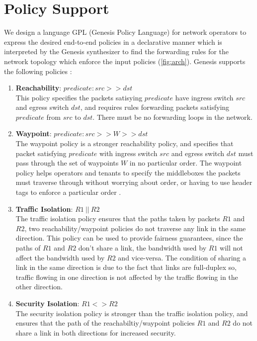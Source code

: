 \section{Policy Support} \label{sec:policy}
We design a language GPL (Genesis Policy Language) for network operators to express the desired end-to-end policies in a declarative manner which is interpreted by the Genesis synthesizer to find the forwarding rules for the network topology which enforce the input policies (\cref{fig:arch}). Genesis supports the following policies : 
\begin{enumerate} 
	\item \textbf{Reachability}: $predicate : src >> dst$ \\
	This policy specifies the packets satisying $predicate$ have ingress switch $src$ and egress switch $dst$, and requires rules forwarding packets satisfying $predicate$ from $src$ to $dst$. There must be no forwarding loops in the network. 
	\item \textbf{Waypoint}: $predicate : src >> W >> dst$ \\
	The waypoint policy is a stronger reachability policy, and specifies that packet satisfying $predicate$ with ingress switch $src$ and egress switch $dst$ must pass through the set of waypoints $W$ in no particular order. The waypoint policy helps operators and tenants to specify the middleboxes the packets must traverse through without worrying about order, or having to use header tags to enforce a particular order \cite{flowtags}. 
	\item \textbf{Traffic Isolation}:  $R1 \ || \ R2$ \\
	The traffic isolation policy ensures that the paths taken by packets $R1$ and $R2$, two reachability/waypoint policies do not traverse any link in the same direction. This policy can be used to provide fairness guarantees, since the paths of $R1$ and $R2$ don't share a link, the bandwidth used by $R1$ will not affect the bandwidth used by $R2$ and vice-versa. The condition of sharing a link in the same direction is due to the fact that links are full-duplex so, traffic flowing in one direction is not affected by the traffic flowing in the other direction.
	\item \textbf{Security Isolation}: $R1 <> R2$ \\
	The security isolation policy is stronger than the traffic isolation policy, and ensures that the path of the reachabiltiy/waypoint policies $R1$ and $R2$ do not share a link in both directions for increased security.

\end{enumerate}
